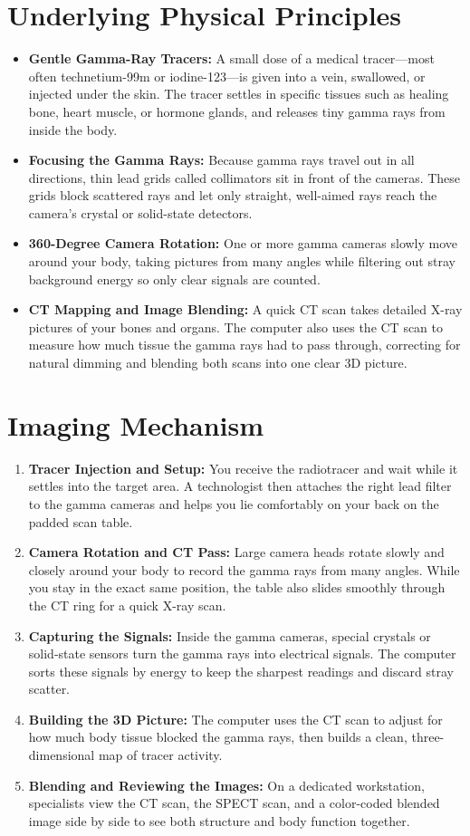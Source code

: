 \section{Underlying Physical Principles}
\begin{itemize}
    \item \textbf{Gentle Gamma-Ray Tracers:} A small dose of a medical tracer---most often technetium-99m or iodine-123---is given into a vein, swallowed, or injected under the skin. The tracer settles in specific tissues such as healing bone, heart muscle, or hormone glands, and releases tiny gamma rays from inside the body.
    \item \textbf{Focusing the Gamma Rays:} Because gamma rays travel out in all directions, thin lead grids called collimators sit in front of the cameras. These grids block scattered rays and let only straight, well-aimed rays reach the camera's crystal or solid-state detectors.
    \item \textbf{360-Degree Camera Rotation:} One or more gamma cameras slowly move around your body, taking pictures from many angles while filtering out stray background energy so only clear signals are counted.
    \item \textbf{CT Mapping and Image Blending:} A quick CT scan takes detailed X-ray pictures of your bones and organs. The computer also uses the CT scan to measure how much tissue the gamma rays had to pass through, correcting for natural dimming and blending both scans into one clear 3D picture.
\end{itemize}

\section{Imaging Mechanism}
\begin{enumerate}
    \item \textbf{Tracer Injection and Setup:} You receive the radiotracer and wait while it settles into the target area. A technologist then attaches the right lead filter to the gamma cameras and helps you lie comfortably on your back on the padded scan table.
    \item \textbf{Camera Rotation and CT Pass:} Large camera heads rotate slowly and closely around your body to record the gamma rays from many angles. While you stay in the exact same position, the table also slides smoothly through the CT ring for a quick X-ray scan.
    \item \textbf{Capturing the Signals:} Inside the gamma cameras, special crystals or solid-state sensors turn the gamma rays into electrical signals. The computer sorts these signals by energy to keep the sharpest readings and discard stray scatter.
    \item \textbf{Building the 3D Picture:} The computer uses the CT scan to adjust for how much body tissue blocked the gamma rays, then builds a clean, three-dimensional map of tracer activity.
    \item \textbf{Blending and Reviewing the Images:} On a dedicated workstation, specialists view the CT scan, the SPECT scan, and a color-coded blended image side by side to see both structure and body function together.
\end{enumerate}

